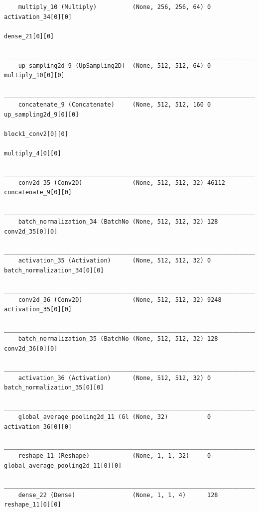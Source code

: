 {\begin{verbatim}
    multiply_10 (Multiply)          (None, 256, 256, 64) 0           activation_34[0][0]              
                                                                        dense_21[0][0]                   
    __________________________________________________________________________________________________
    up_sampling2d_9 (UpSampling2D)  (None, 512, 512, 64) 0           multiply_10[0][0]                
    __________________________________________________________________________________________________
    concatenate_9 (Concatenate)     (None, 512, 512, 160 0           up_sampling2d_9[0][0]            
                                                                        block1_conv2[0][0]               
                                                                        multiply_4[0][0]                 
    __________________________________________________________________________________________________
    conv2d_35 (Conv2D)              (None, 512, 512, 32) 46112       concatenate_9[0][0]              
    __________________________________________________________________________________________________
    batch_normalization_34 (BatchNo (None, 512, 512, 32) 128         conv2d_35[0][0]                  
    __________________________________________________________________________________________________
    activation_35 (Activation)      (None, 512, 512, 32) 0           batch_normalization_34[0][0]     
    __________________________________________________________________________________________________
    conv2d_36 (Conv2D)              (None, 512, 512, 32) 9248        activation_35[0][0]              
    __________________________________________________________________________________________________
    batch_normalization_35 (BatchNo (None, 512, 512, 32) 128         conv2d_36[0][0]                  
    __________________________________________________________________________________________________
    activation_36 (Activation)      (None, 512, 512, 32) 0           batch_normalization_35[0][0]     
    __________________________________________________________________________________________________
    global_average_pooling2d_11 (Gl (None, 32)           0           activation_36[0][0]              
    __________________________________________________________________________________________________
    reshape_11 (Reshape)            (None, 1, 1, 32)     0           global_average_pooling2d_11[0][0]
    __________________________________________________________________________________________________
    dense_22 (Dense)                (None, 1, 1, 4)      128         reshape_11[0][0]                 

\end{verbatim}}
